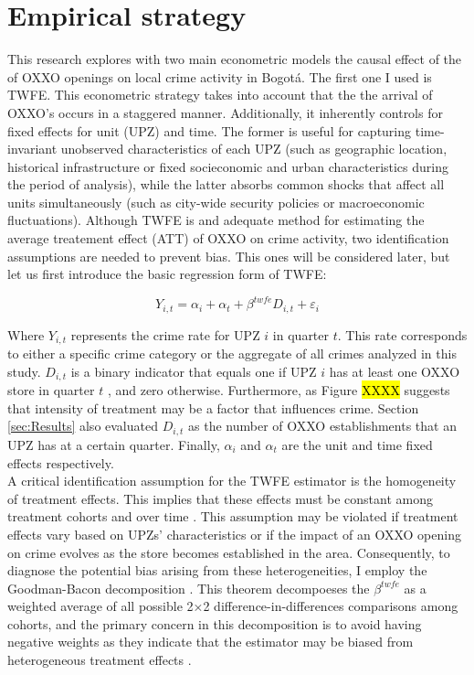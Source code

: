 \documentclass[12pt]{article}
\begin{document}
\section{Empirical strategy}

This research explores with two main econometric models the causal effect of the of OXXO openings on local crime activity in Bogotá. The first one I used is TWFE. 
This econometric strategy takes into account that the the arrival of OXXO’s occurs in a staggered manner. 
Additionally, it inherently controls for fixed effects for unit (UPZ) and time. 
The former is useful for capturing time-invariant unobserved characteristics of each UPZ (such as geographic location, historical infrastructure or fixed socieconomic and urban characteristics during the period of analysis), while the latter absorbs common shocks that affect all units simultaneously (such as city-wide security policies or macroeconomic fluctuations). 
Although TWFE is and adequate method for estimating the average treatement effect (ATT) of OXXO on crime activity, two identification assumptions are needed to prevent bias. 
This ones will be considered later, but let us first introduce the basic regression form of TWFE:

\begin{equation}
Y_{i,t} = \alpha_i + \alpha_t  +\beta^{twfe} D_{i,t} + \varepsilon_{i}
\label{eq:twfe}
\end{equation}

Where $ Y_{i,t} $ represents the crime rate for UPZ $i$ in quarter $t$. 
This rate corresponds to either a specific crime category or the aggregate of all crimes analyzed in this study. 
$D_{i,t}$ is a binary indicator that equals one if UPZ $i$  has at least one OXXO store in quarter $t$ , and zero otherwise. 
Furthermore, as Figure \hl{XXXX} suggests that intensity of treatment may be a factor that influences crime. 
Section \ref{sec:Results} also evaluated $D_{i,t}$ as the number of OXXO establishments that an UPZ has at a certain quarter. 
Finally, $\alpha_i$ and  $\alpha_t$ are the unit and time fixed effects respectively.\\ 

A critical identification assumption for the TWFE estimator is the homogeneity of treatment effects. 
This implies that these effects must be constant among treatment cohorts and over time \parencite{deChaisemartin2023survey}. 
This assumption may be violated if treatment effects vary based on UPZs’ characteristics or if the impact of an OXXO opening on crime evolves as the store becomes established in the area. 
Consequently, to diagnose the potential bias arising from these heterogeneities, I employ the Goodman-Bacon decomposition \parencite{GoodmanBacon2021}.  
This theorem decompoeses the $\beta^{twfe}$ as a weighted average of all possible 2×2 difference-in-differences comparisons among cohorts, and the primary concern in this decomposition is to avoid having negative weights as they indicate that the estimator may be biased from heterogeneous treatment effects \parencite{GoodmanBacon2021}.\\
\end{document}
